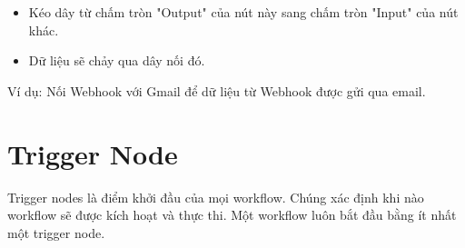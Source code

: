 \begin{itemize}
    \item Kéo dây từ chấm tròn "Output" của nút này sang chấm tròn "Input" của nút khác.
    \item Dữ liệu sẽ chảy qua dây nối đó.
\end{itemize}

Ví dụ: Nối Webhook với Gmail để dữ liệu từ Webhook được gửi qua email.

\section{Trigger Node}
Trigger nodes là điểm khởi đầu của mọi workflow. Chúng xác định khi nào workflow sẽ được kích hoạt và thực thi. Một workflow luôn bắt đầu bằng ít nhất một trigger node.

